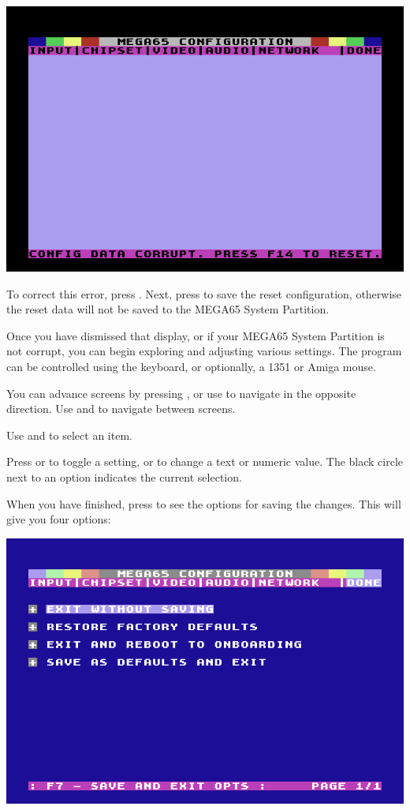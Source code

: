 \begin{center}
  \includegraphics[width=0.7\linewidth]{images/ss-m65config-corrupt.png}
\end{center}

To correct this error, press . Next, press  to save the reset configuration, otherwise the reset data will not be saved to the MEGA65 System
Partition.

Once you have dismissed that display, or if your MEGA65 System Partition is not corrupt, you can begin exploring and adjusting various settings. The program can be controlled using the keyboard, or optionally, a 1351 or Amiga\texttrademark{} mouse.

You can advance screens by pressing , or use  to navigate in the opposite direction. Use \megakey{$\leftarrow$} and \megakey{$\rightarrow$} to navigate between screens.

Use \megakey{$\uparrow$} and \megakey{$\downarrow$} to select an item.

Press  or  to toggle a setting, or to change a text or numeric value. The black circle next to an option indicates the current selection.

  When you have finished, press  to see the
  options for saving the changes. This will give you four options:

\begin{center}
  \includegraphics[width=0.7\linewidth]{images/ss-m65config-save.png}
\end{center}

